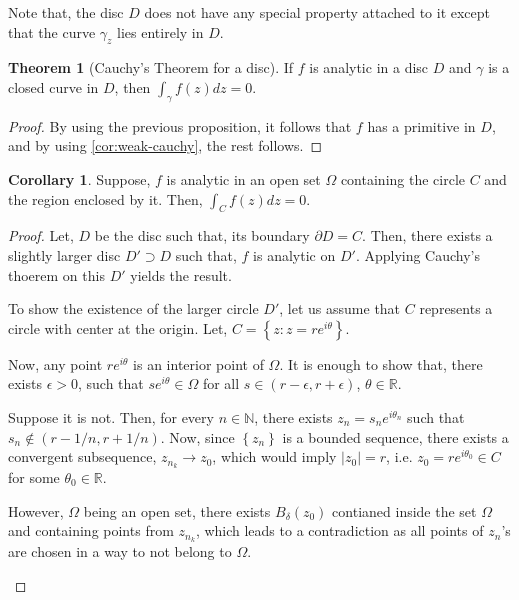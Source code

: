 \documentclass[12pt]{article}
\newcommand{\R}{\mathbb{R}}
\newcommand{\N}{\mathbb{N}}
\theoremstyle{definition}
\newtheorem{thm}{Theorem}
\newtheorem{cor}{Corollary}
\newenvironment{theorem}{
\begin{tcolorbox}[colback=green!5!white,colframe=green!75!black, parbox = false]\begin{thm} }{\end{thm}\end{tcolorbox} }
\newenvironment{note}{
\begin{tcolorbox}[colback=blue!5!white,colframe=blue!75!black,title=Note, parbox = false] }{\end{tcolorbox} }
\newenvironment{corollary}{
\begin{tcolorbox}[colback=blue!5!white,colframe=blue!75!black, parbox = false]\begin{cor} }{\end{cor}\end{tcolorbox} }
\begin{document}
\begin{note}
    Note that, the disc $D$ does not have any special property attached to it except that the curve $\gamma_z$ lies entirely in $D$.
\end{note}

\begin{theorem}[Cauchy's Theorem for a disc]
    If $f$ is analytic in a disc $D$ and $\gamma$ is a closed curve in $D$, then $\int_{\gamma} f(z)dz = 0$.
\end{theorem}

\begin{proof}
    By using the previous proposition, it follows that $f$ has a primitive in $D$, and by using \cref{cor:weak-cauchy}, the rest follows.
\end{proof}

\begin{corollary}
    Suppose, $f$ is analytic in an open set $\Omega$ containing the circle $C$ and the region enclosed by it. Then, $\int_{C} f(z)dz = 0$.
\end{corollary}

\begin{proof}
    Let, $D$ be the disc such that, its boundary $\partial D = C$. Then, there exists a slightly larger disc $D' \supset D$ such that, $f$ is analytic on $D'$. Applying Cauchy's thoerem on this $D'$ yields the result.

    \begin{note}
        To show the existence of the larger circle $D'$, let us assume that $C$ represents a circle with center at the origin. Let, $C = \left\{ z : z = r e^{i\theta} \right\}$.

        Now, any point $r e^{i\theta}$ is an interior point of $\Omega$. It is enough to show that, there exists $\epsilon > 0$, such that $s e^{i\theta} \in \Omega$ for all $s \in (r - \epsilon, r + \epsilon)$, $\theta \in \R$.

        Suppose it is not. Then, for every $n \in \N$, there exists $z_n = s_n e^{i\theta_n}$ such that $s_n \notin (r - 1/n, r + 1/n)$. Now, since $\left\{z_n\right\}$ is a bounded sequence, there exists a convergent subsequence, $z_{n_k} \rightarrow z_0$, which would imply $\vert z_0 \vert = r$, i.e. $z_0 = r e^{i\theta_0} \in C$ for some $\theta_0 \in \R$. 
        
        However, $\Omega$ being an open set, there exists $B_{\delta}(z_0)$ contianed inside the set $\Omega$ and containing points from $z_{n_k}$, which leads to a contradiction as all points of $z_n$'s are chosen in a way to not belong to $\Omega$.
    \end{note}
\end{proof}
\end{document}
